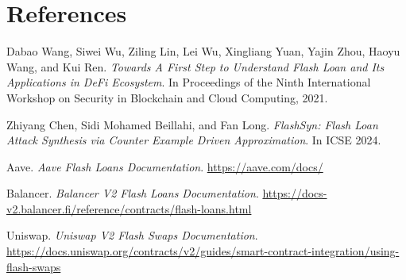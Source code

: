 \section*{References}

\begin{enumerate}[label={[\arabic*]}]
    \item Dabao Wang, Siwei Wu, Ziling Lin, Lei Wu, Xingliang Yuan, Yajin Zhou, Haoyu Wang, and Kui Ren. \textit{Towards A First Step to Understand Flash Loan and Its Applications in DeFi Ecosystem}. In Proceedings of the Ninth International Workshop on Security in Blockchain and Cloud Computing, 2021.
    \item Zhiyang Chen, Sidi Mohamed Beillahi, and Fan Long. \textit{FlashSyn: Flash Loan Attack Synthesis via Counter Example Driven Approximation}. In ICSE 2024.
    \item Aave. \textit{Aave Flash Loans Documentation}. \url{https://aave.com/docs/}
    \item Balancer. \textit{Balancer V2 Flash Loans Documentation}. \url{https://docs-v2.balancer.fi/reference/contracts/flash-loans.html}
    \item Uniswap. \textit{Uniswap V2 Flash Swaps Documentation}. \url{https://docs.uniswap.org/contracts/v2/guides/smart-contract-integration/using-flash-swaps}
\end{enumerate}
